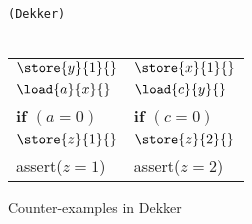 \begin{figure}[!htb]
	\begin{center}
		\texttt{(Dekker)} \\ \ \\
		\begin{tabular}{l||l}
			$ \store{y}{1}{} $ & $ \store{x}{1}{} $ \\
			$ \load{a}{x}{} $ & $ \load{c}{y}{} $ \\
			\textbf{if} $ (a=0) $ & \textbf{if} $ (c=0) $ \\
			\quad $ \store{z}{1}{} $ & \quad $ \store{z}{2}{} $ \\
			\quad assert($ z=1 $) & \quad assert($ z=2 $) \\
		\end{tabular} 
	\end{center}
\end{figure}

\begin{figure}[!h]
	
	
	\caption{Counter-examples in Dekker}
	\label{fig:dekker-ce}
\end{figure}



